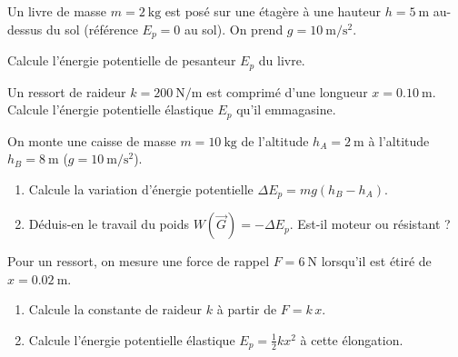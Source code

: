 \documentclass[11pt,a4paper]{article}
\newcommand{\vv}[1]{\vec{#1}}\newcommand{\ds}{\displaystyle}
\begin{document}

\begin{exo}
Un livre de masse $m=\qty{2}{\kilogram}$ est posé sur une étagère à une hauteur $h=\qty{5}{\metre}$
au-dessus du sol (référence $E_p=0$ au sol). On prend $g=\qty{10}{\metre\per\second\squared}$.
\begin{center}
\end{center}
Calcule l'énergie potentielle de pesanteur $E_p$ du livre.
\end{exo}

\begin{exo}
Un ressort de raideur $k=\qty{200}{\newton\per\metre}$ est comprimé d'une longueur
$x=\qty{0,10}{\metre}$. Calcule l'énergie potentielle élastique $E_p$ qu'il emmagasine.
\end{exo}

\begin{exo}
On monte une caisse de masse $m=\qty{10}{\kilogram}$ de l'altitude $h_A=\qty{2}{\metre}$ à l'altitude
$h_B=\qty{8}{\metre}$ ($g=\qty{10}{\metre\per\second\squared}$).
\begin{enumerate}[label=\alph*)]
  \item Calcule la variation d'énergie potentielle $\Delta E_p=mg(h_B-h_A)$.
  \item Déduis-en le travail du poids $W(\vv G)=-\Delta E_p$. Est-il moteur ou résistant ?
\end{enumerate}
\end{exo}

\begin{exo}
Pour un ressort, on mesure une force de rappel $F=\qty{6}{\newton}$ lorsqu'il est étiré de
$x=\qty{0,02}{\metre}$.
\begin{enumerate}[label=\alph*)]
  \item Calcule la constante de raideur $k$ à partir de $F=k\,x$.
  \item Calcule l'énergie potentielle élastique $E_p=\tfrac12 k x^2$ à cette élongation.
\end{enumerate}
\end{exo}
\end{document}
